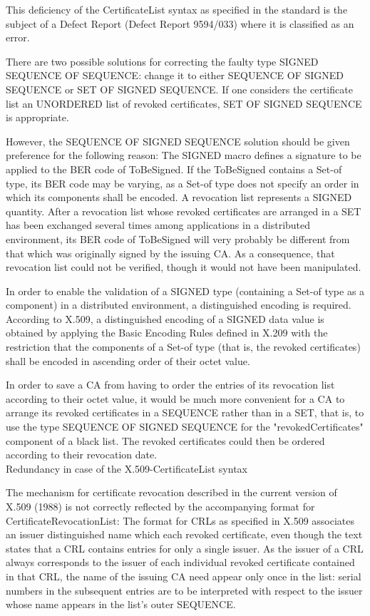 This deficiency of the CertificateList syntax as specified in the
standard is the subject of a Defect Report (Defect Report 9594/033)
where it is classified as an error.


There are two possible solutions for correcting the faulty type
SIGNED SEQUENCE OF SEQUENCE: change it to either SEQUENCE OF SIGNED
SEQUENCE or SET OF SIGNED SEQUENCE. If one considers the certificate
list an UNORDERED list of revoked certificates, SET OF SIGNED SEQUENCE
is appropriate.

However, the SEQUENCE OF SIGNED SEQUENCE solution should be given
preference for the following reason: The SIGNED macro defines a
signature to be applied to the BER code of ToBeSigned.
If the ToBeSigned contains a Set-of type, its BER code may be
varying, as a Set-of type does not specify an order in which
its components shall be encoded. A revocation list represents a
SIGNED quantity. After a revocation list whose revoked certificates
are arranged in a SET has been exchanged several times among
applications in a distributed environment, its BER code of
ToBeSigned will very probably be different from that which was
originally signed by the issuing CA. As a consequence, that
revocation list could not be verified, though it would not have
been manipulated.

In order to enable the validation of a SIGNED type (containing a
Set-of type as a component) in a distributed environment, a
distinguished encoding is required. According to X.509, a
distinguished encoding of a SIGNED data value is obtained by
applying the Basic Encoding Rules defined in X.209 with the restriction
that the components of a Set-of type (that is, the revoked certificates)
shall be encoded in ascending order of their octet value.

In order to save a CA from having to order the entries of
its revocation list according to their octet value, it would be
much more convenient for a CA to arrange its revoked certificates
in a SEQUENCE rather than in a SET, that is, to use the type
SEQUENCE OF SIGNED SEQUENCE for the "revokedCertificates" component
of a black list. The revoked certificates could then be ordered
according to their revocation date.
\\ [1em]
Redundancy in case of the X.509-CertificateList syntax

The mechanism for certificate revocation described in the current
version of X.509 (1988) is not correctly reflected by the
accompanying format for CertificateRevocationList: The format for
CRLs as specified in X.509 associates an issuer distinguished name
which each revoked certificate, even though the text states that a
CRL contains entries for only a single issuer. As the issuer of a CRL
always corresponds to the issuer of each individual revoked certificate
contained in that CRL, the name of the issuing CA need appear only
once in the list: serial numbers in the subsequent entries are to be
interpreted with respect to the issuer whose name appears in the list's
outer SEQUENCE.


